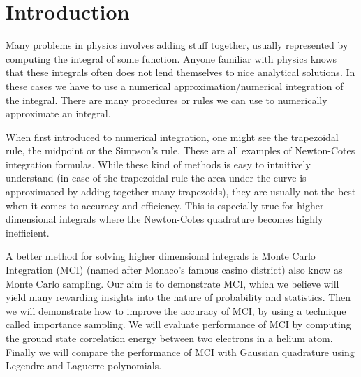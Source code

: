 \section{Introduction}

Many problems in physics involves adding stuff together, usually represented by
computing the integral of some function. Anyone familiar with physics knows that
these integrals often does not lend themselves to nice analytical solutions. In
these cases we have to use a numerical approximation/numerical integration of the integral.  
There are many procedures or rules we can use to numerically approximate an
integral. 

When first introduced to numerical integration, one might see the trapezoidal
rule, the midpoint or the Simpson's rule. These are all examples of
Newton-Cotes integration formulas. While these kind of methods is easy to
intuitively understand (in case of the trapezoidal rule the area under the curve
is approximated by adding together many trapezoids), they are usually not the
best when it comes to accuracy and efficiency. This is especially true for
higher dimensional integrals where the Newton-Cotes quadrature becomes highly
inefficient. 

A better method for solving higher dimensional integrals is Monte Carlo
Integration (MCI) (named after Monaco's famous casino district) also know as
Monte Carlo sampling.  
Our aim is to demonstrate MCI, which we believe will yield
many rewarding insights into the nature of probability and statistics. Then we
will demonstrate how to improve the accuracy of  MCI, by
using a technique called importance sampling. We will evaluate
performance of MCI by computing the ground state correlation
energy between two electrons in a helium atom. Finally we will compare the
performance of MCI with Gaussian quadrature using Legendre and Laguerre
polynomials.   

